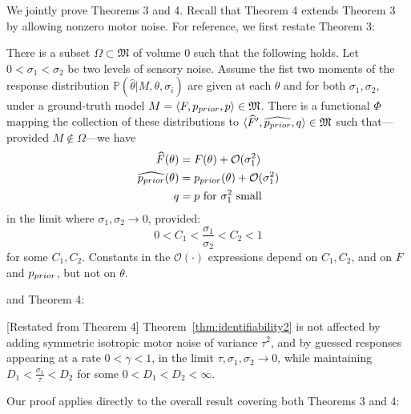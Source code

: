 We jointly prove Theorems 3 and 4. Recall that Theorem 4 extends Theorem 3 by allowing nonzero motor noise.
For reference, we first restate Theorem 3:
\begin{thm}\label{thm:identifiability2}
There is a subset $\Omega \subset \mathfrak{M}$ of volume $0$ such that the following holds.
Let $0 < \sigma_1 < \sigma_2$ be two levels of sensory noise.
Assume the fist two moments of the response distribution $\mathbb{P}(\widehat{\theta}|M,\theta, \sigma_i)$ are given at each $\theta$ and for both $\sigma_1, \sigma_2$, under a ground-truth model $M = \langle F, p_{prior},p \rangle \in \mathfrak{M}$.
There is a functional $\Phi$ mapping the collection of these distributions to $\langle \widehat{F}', \widehat{p_{prior}},q \rangle \in \mathfrak{M}$
such that---provided $M \not\in \Omega$---we have
\begin{align*}
    \widehat{F}(\theta) &= F(\theta) + \mathcal{O}(\sigma_1^2) \\
    \widehat{p_{prior}}(\theta) &= p_{prior}(\theta) + \mathcal{O}(\sigma_1^2) \\
    q &= p  \text{ for $\sigma_1^2$ small}
\end{align*}
in the limit where $\sigma_1, \sigma_2 \rightarrow 0$, provided:  
\begin{equation}
0 < C_1 < \frac{\sigma_1}{\sigma_2} < C_2 < 1    
\end{equation}
for some $C_1, C_2$.
Constants in the $\mathcal{O}(\cdot)$ expressions depend on $C_1, C_2$, and on $F$ and $p_{prior}$, but not on $\theta$.
\end{thm}
and Theorem 4:
\begin{thm}\label{thm:identifiability2-motor}[Restated from Theorem 4]
Theorem~\ref{thm:identifiability2} is not affected by adding symmetric isotropic motor noise of variance $\tau^2$, and by guessed responses appearing at a rate $0 < \gamma < 1$, in the limit $\tau, \sigma_1, \sigma_2 \rightarrow 0$, while maintaining $D_1 < \frac{\sigma_1}{\tau} < D_2$ for some $0 < D_1 < D_2 < \infty$.
\end{thm}
Our proof applies directly to the overall result covering both Theorems 3 and 4:
